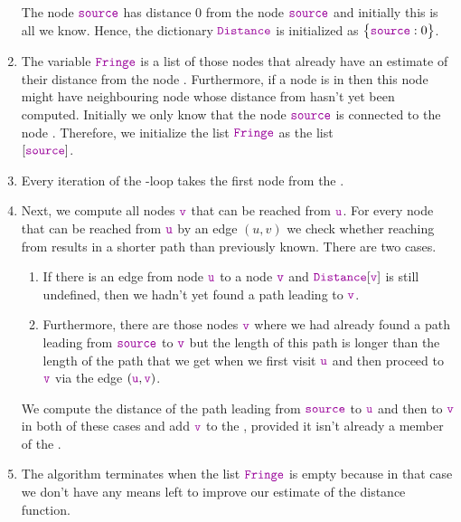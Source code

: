 \begin{enumerate}
      The node $\mytt{source}$ has distance $0$ from the node $\mytt{source}$ and initially this is
      all we know.  Hence, the dictionary $\mytt{Distance}$ is initialized as $\bigl\{\mytt{source}:0 \bigr\}$.
\item The variable $\mytt{Fringe}$ is a list of those nodes that already have an estimate of
      their distance from the  node .  Furthermore, if a node is in  then this
      node might have neighbouring node whose distance from  hasn't yet been computed. 
      Initially we only know that the node $\mytt{source}$ is connected to the node .
      Therefore, we initialize the list $\mytt{Fringe}$ as the list
      \\[0.2cm]
      \hspace*{1.3cm}
      $[ \mytt{source} ]$.
\item Every iteration of the -loop takes the first node  from the .
\item Next, we compute all nodes $\mytt{v}$ that can be reached from $\mytt{u}$. For every node 
      that can be reached from $\mytt{u}$ by an edge $(u, v)$ we check whether 
      reaching  from  results in a shorter path than previously known.
      There are two cases.
      \begin{enumerate}
      \item If there is an edge from node $\mytt{u}$ to a node $\mytt{v}$ and  $\mytt{Distance}[\mytt{v}]$ is still
            undefined, then we hadn't yet found a path leading to $\mytt{v}$.
      \item Furthermore, there are those nodes $\mytt{v}$ where we had already found a path leading from
            $\mytt{source}$ to $\mytt{v}$ but the length of this path is longer than the length of the path
            that we get when we first visit $\mytt{u}$ and then proceed to $\mytt{v}$ via the edge $(\mytt{u},\mytt{v})$.
      \end{enumerate}
      We compute the distance of the path leading from $\mytt{source}$ to $\mytt{u}$ and then to
      $\mytt{v}$ in both of these cases and add $\mytt{v}$ to the , provided it isn't
      already a member of the .
\item The algorithm terminates when the list $\mytt{Fringe}$ is empty because in that case we don't
      have any means left to improve our estimate of the distance function.
\end{enumerate}

